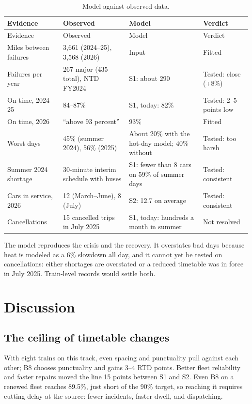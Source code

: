 \documentclass[11pt]{article}
\begin{document}
{\small
\begin{longtable}{@{}p{3.3cm}p{4.3cm}p{4.3cm}p{3.1cm}@{}}
\caption{Model against observed data.}\label{tab:valid}\\
\toprule
Evidence & Observed & Model & Verdict \\ \midrule\endfirsthead
\toprule Evidence & Observed & Model & Verdict \\ \midrule\endhead
Miles between failures & 3{,}661 (2024--25), 3{,}568 (2026) \citep{njt_mdbf} & Input & Fitted \\
Failures per year & 267 major (435 total), NTD FY2024 \citep{ntd_breakdowns2224} & S1: about 290 & Tested: close (+8\%) \\
On time, 2024--25 & 84--87\% \citep{njtod2026,ols2027njt} & S1, today: 82\% & Tested: 2--5 points low \\
On time, 2026 & ``above 93 percent'' \citep{ols2027njt} & 93\% & Fitted \\
Worst days & 45\% (summer 2024), 56\% (2025) \citep{ols2027njt} & About 20\% with the hot-day model; 40\% without & Tested: too harsh \\
Summer 2024 shortage & 30-minute interim schedule with buses \citep{njt2024interim} & S1: fewer than 8 cars on 59\% of summer days & Tested: consistent \\
Cars in service, 2026 & 12 (March--June), 8 (July) \citep{ntd_monthly} & S2: 12.7 on average & Tested: consistent \\
Cancellations & 15 cancelled trips in July 2025 \citep{singleton2025} & S1, today: hundreds a month in summer & Not resolved \\
\bottomrule
\end{longtable}}

The model reproduces the crisis and the recovery. It overstates bad days because heat is modeled as a 6\% slowdown all day, and it cannot yet be tested on cancellations: either shortages are overstated or a reduced timetable was in force in July 2025. Train-level records would settle both.

\section{Discussion}\label{sec:discussion}
\subsection{The ceiling of timetable changes}
With eight trains on this track, even spacing and punctuality pull against each other; B8 chooses punctuality and gains 3--4 RTD points. Better fleet reliability and faster repairs moved the line 15 points between S1 and S2. Even B8 on a renewed fleet reaches 89.5\%, just short of the 90\% target, so reaching it requires cutting delay at the source: fewer incidents, faster dwell, and dispatching.
\end{document}
